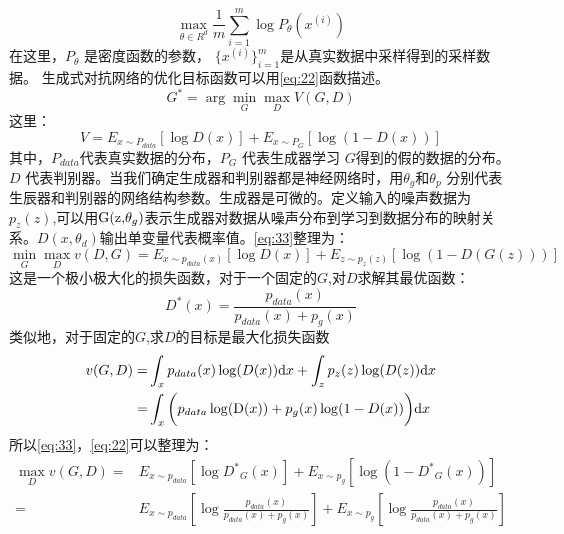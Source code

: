 \begin{equation}
\label{eq:EM}
\max \limits_{\theta\in R^{d}}\frac{1}{m} \sum_{i=1}^m \log P_{\theta}(x^{(i)})
\end{equation}
在这里，$P_{\theta}$ 是密度函数的参数， $\{x^{(i)}\}^{m} _{i=1}$是从真实数据中采样得到的采样数据。
生成式对抗网络的优化目标函数可以用\ref{eq:22}函数描述。
\begin{equation}
\label{eq:22}
G^{*}=\arg \min \limits_{G} \max \limits_{D} V(G,D)
\end{equation}
这里：
\begin{equation}
\label{eq:33}
V=E_{x\sim P_{data}} [\log D(x)]+E_{x\sim P_{G}}[\log (1-D(x))]
\end{equation}
其中，$P_{data}$代表真实数据的分布，$P_{G}$ 代表生成器学习 $G$得到的假的数据的分布。 $D$ 代表判别器。当我们确定生成器和判别器都是神经网络时，用${\theta _g}$和${\theta _p}$ 分别代表生辰器和判别器的网络结构参数。生成器是可微的。定义输入的噪声数据为$ {p_z}(z)$,可以用${\rm{G(z,}}{\theta _g}{\rm{)}}$表示生成器对数据从噪声分布到学习到数据分布的映射关系。$D(x,{\theta _d})$输出单变量代表概率值。\ref{eq:33}整理为：
\begin{equation}
\label{eq:44}
\mathop {\min }\limits_G \mathop {\max }\limits_D v(D,G) = {E_{x \sim {p_{data}}(x)}}[\log D(x)] + {E_{z \sim {p_z}(z)}}[\log (1 - D(G(z)))]
\end{equation}
 这是一个极小极大化的损失函数，对于一个固定的$G$,对$D$求解其最优函数：
 \begin{equation}
 \label{eq:34}
 {D^*}(x) = \frac{{{p_{data}}(x)}}{{{p_{data}}(x) + {p_g}(x)}}
\end{equation}
 类似地，对于固定的$G$,求$D$的目标是最大化损失函数
\begin{equation}\label{eq:36}
\begin{split}
v(G,D) =& \int_x {{p_{data}}(x)\log (D(x))}\mathrm{d}x + \int_z {{p_z}(z)\log (D(z))}\mathrm{d}x  \\
=&  \int_x \bigg( {{p_{data}}\log ({\rm{D}}(x)) + {p_g}(x)\log (1 - D(x))\bigg)}\mathrm{d}x 
\end{split}
\end{equation}
所以\ref{eq:33}，\ref{eq:22}可以整理为：
\begin{equation}
\label{eq:35}
\begin{split}
\mathop {\max }\limits_D v(G,D) =& {E_{x \sim {p_{data}}}}[\log {D^*}_G(x)] + {E_{x \sim {p_g}}}[\log (1 - {D^*}_G(x))] \\
=& {E_{x \sim {p_{data}}}}[\log \frac{{{p_{data}}(x)}}{{{p_{data}}(x) + {p_g}(x)}}] + {E_{x \sim {p_g}}}[\log \frac{{{p_{data}}(x)}}{{{p_{data}}(x) + {p_g}(x)}}]
\end{split}
\end{equation}
